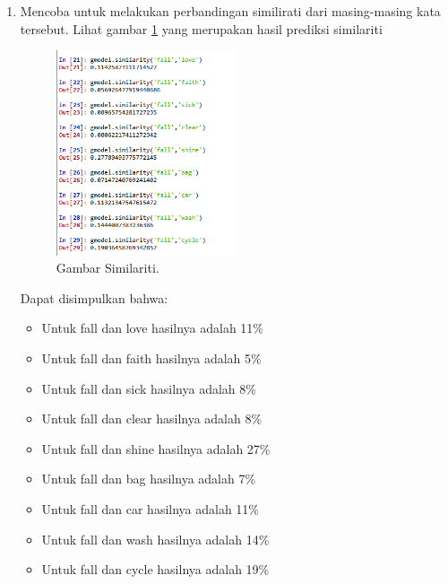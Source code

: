 \begin{enumerate}
\item Mencoba untuk melakukan perbandingan similirati dari masing-masing kata tersebut. Lihat gambar \ref{12similariti} yang merupakan hasil prediksi similariti
	\begin{figure}[ht]
	\centerline{\includegraphics[width=0.5\textwidth]{figures/chapter5/12similariti.png}}
	\caption{Gambar Similariti.}	
	\label{12similariti}
	\end{figure}
	Dapat disimpulkan bahwa:
		\begin{itemize}
		\item Untuk fall dan love hasilnya adalah 11\%
		\item Untuk fall dan faith hasilnya adalah 5\%
		\item Untuk fall dan sick hasilnya adalah 8\%
		\item Untuk fall dan clear hasilnya adalah 8\%
		\item Untuk fall dan shine hasilnya adalah 27\%
		\item Untuk fall dan bag hasilnya adalah 7\%
		\item Untuk fall dan car hasilnya adalah 11\%
		\item Untuk fall dan wash hasilnya adalah 14\%
		\item Untuk fall dan cycle hasilnya adalah 19\%
		

\end{itemize}
\end{enumerate}
